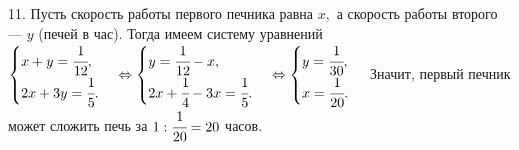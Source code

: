 11. Пусть скорость работы первого печника равна $x,$ а скорость работы второго --- $y$ (печей в час). Тогда имеем систему уравнений
$\begin{cases} x+y=\cfrac{1}{12},\\ 2x+3y=\cfrac{1}{5}.\end{cases}
\Leftrightarrow \begin{cases} y=\cfrac{1}{12}-x,\\ 2x+\cfrac{1}{4}-3x=\cfrac{1}{5}.\end{cases}
\Leftrightarrow \begin{cases} y=\cfrac{1}{30},\\ x=\cfrac{1}{20}.\end{cases}$
Значит, первый печник может сложить печь за $1:\cfrac{1}{20}=20$ часов.\\
